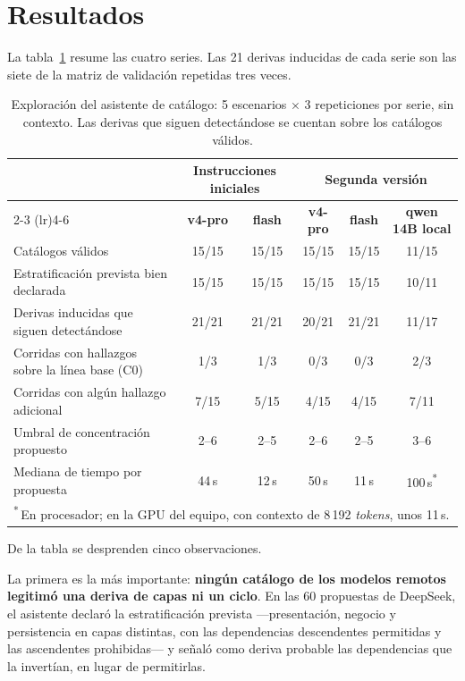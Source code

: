 \section{Resultados}
La tabla~\ref{tab:asistente} resume las cuatro series. Las 21 derivas inducidas de cada serie son las siete de la matriz de validación repetidas tres veces.

\begin{table}[H]
\centering
\caption{Exploración del asistente de catálogo: 5 escenarios × 3 repeticiones por serie, sin contexto. Las derivas que siguen detectándose se cuentan sobre los catálogos válidos.}
\label{tab:asistente}
\footnotesize
\setlength{\tabcolsep}{4pt}
\begin{tabularx}{\textwidth}{Xccccc}
\toprule
& \multicolumn{2}{c}{\textbf{Instrucciones iniciales}} & \multicolumn{3}{c}{\textbf{Segunda versión}} \\
\cmidrule(lr){2-3} \cmidrule(lr){4-6}
& \textbf{v4-pro} & \textbf{flash} & \textbf{v4-pro} & \textbf{flash} & \textbf{qwen 14B local} \\
\midrule
Catálogos válidos & 15/15 & 15/15 & 15/15 & 15/15 & 11/15 \\
Estratificación prevista bien declarada & 15/15 & 15/15 & 15/15 & 15/15 & 10/11 \\
Derivas inducidas que siguen detectándose & 21/21 & 21/21 & 20/21 & 21/21 & 11/17 \\
Corridas con hallazgos sobre la línea base (C0) & 1/3 & 1/3 & 0/3 & 0/3 & 2/3 \\
Corridas con algún hallazgo adicional & 7/15 & 5/15 & 4/15 & 4/15 & 7/11 \\
Umbral de concentración propuesto & 2--6 & 2--5 & 2--6 & 2--5 & 3--6 \\
Mediana de tiempo por propuesta & 44\,s & 12\,s & 50\,s & 11\,s & 100\,s\textsuperscript{*} \\
\bottomrule
\multicolumn{6}{l}{\textsuperscript{*}\,En procesador; en la GPU del equipo, con contexto de 8\,192 \textit{tokens}, unos 11\,s.}
\end{tabularx}
\end{table}

De la tabla se desprenden cinco observaciones.

La primera es la más importante: \textbf{ningún catálogo de los modelos remotos legitimó una deriva de capas ni un ciclo}. En las 60 propuestas de DeepSeek, el asistente declaró la estratificación prevista ---presentación, negocio y persistencia en capas distintas, con las dependencias descendentes permitidas y las ascendentes prohibidas--- y señaló como deriva probable las dependencias que la invertían, en lugar de permitirlas.

